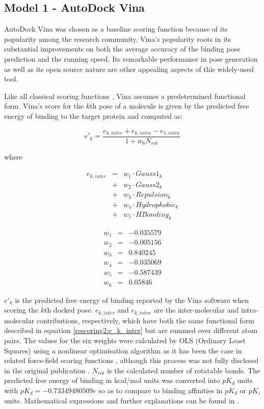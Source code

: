 \documentclass[twocolumn]{bmcart}
\begin{document}
\subsection*{Model 1 - AutoDock Vina}

AutoDock Vina \cite{595} was chosen as a baseline scoring function because of its popularity among the research community. Vina's popularity roots in its substantial improvements on both the average accuracy of the binding pose prediction and the running speed. Its remarkable performance in pose generation as well as its open source nature are other appealing aspects of this widely-used tool.

Like all classical scoring functions \cite{1647}, Vina assumes a predetermined functional form. Vina's score for the $k$th pose of a molecule is given by the predicted free energy of binding to the target protein and computed as:

\begin{equation}
\label{rescoring2:e_k}
e'_k=\frac{e_{k,inter}+e_{k,intra}-e_{1,intra}}{1+w_6N_{rot}}
\end{equation}

where

\begin{eqnarray}
\label{rescoring2:e_k_inter}
e_{k,inter} &=& w_1 \cdot Gauss1_k \nonumber \\
            &+& w_2 \cdot Gauss2_k \nonumber \\
		    &+& w_3 \cdot Repulsion_k \nonumber \\
		    &+& w_4 \cdot Hydrophobic_k \nonumber \\
		    &+& w_5 \cdot HBonding_k
\end{eqnarray}

\begin{eqnarray}
\label{rescoring2:w}
w_1 &=& -0.035579 \nonumber \\
w_2 &=& -0.005156 \nonumber \\
w_3 &=&  0.840245 \nonumber \\
w_4 &=& -0.035069 \nonumber \\
w_5 &=& -0.587439 \nonumber \\
w_6 &=&  0.05846
\end{eqnarray}

$e'_k$ is the predicted free energy of binding reported by the Vina software when scoring the $k$th docked pose. $e_{k,inter}$ and $e_{k,intra}$ are the inter-molecular and intra-molecular contributions, respectively, which have both the same functional form described in equation \ref{rescoring2:e_k_inter} but are summed over different atom pairs. The values for the six weights were calculated by OLS (Ordinary Least Squares) using a nonlinear optimisation algorithm as it has been the case in related force-field scoring functions \cite{1454}, although this process was not fully disclosed in the original publication \cite{595}. $N_{rot}$ is the calculated number of rotatable bonds. The predicted free energy of binding in kcal/mol units was converted into $pK_d$ units with $pK_d=-0.73349480509e$ so as to compare to binding affinities in $pK_d$ or $pK_i$ units. Mathematical expressions and further explanations can be found in \cite{1362}.
\end{document}
